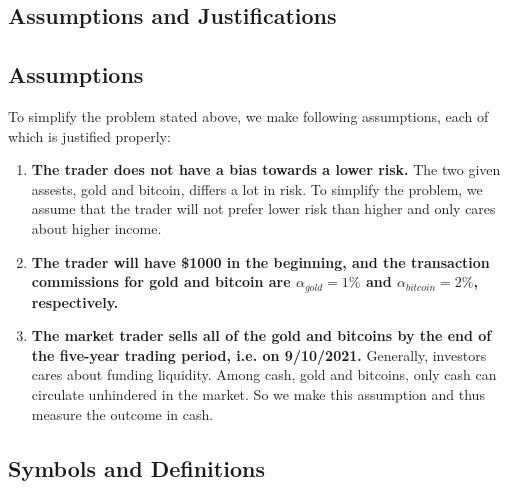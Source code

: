 \documentclass[12pt,a4paper]{article}
\begin{document}
\begin{spacing}{1.2}
\section{Assumptions and Justifications}
\label{Assumptions_Justifications}

\subsection{Assumptions}
To simplify the problem stated above, we make following assumptions, each of which is justified properly: 
\begin{enumerate}
	
	\item \textbf{The trader does not have a bias towards a lower risk.} The two given assests, gold and bitcoin, differs a lot in risk. To simplify the problem, we assume that the trader will not prefer lower risk than higher and only cares about higher income.
	
	\item \textbf{The trader will have \$1000 in the beginning, and the transaction commissions for gold and bitcoin are $\alpha_{gold}=1\%$ and $\alpha_{bitcoin}=2\%$, respectively.}


	\item \textbf{The market trader sells all of the gold and bitcoins by the end of the five-year trading period, i.e. on 9/10/2021.} Generally, investors cares about funding liquidity. Among cash, gold and bitcoins, only cash can circulate unhindered in the market. So we make this assumption and thus measure the outcome in cash.
	
\end{enumerate}


\subsection{Symbols and Definitions}


\end{spacing}
\end{document}
